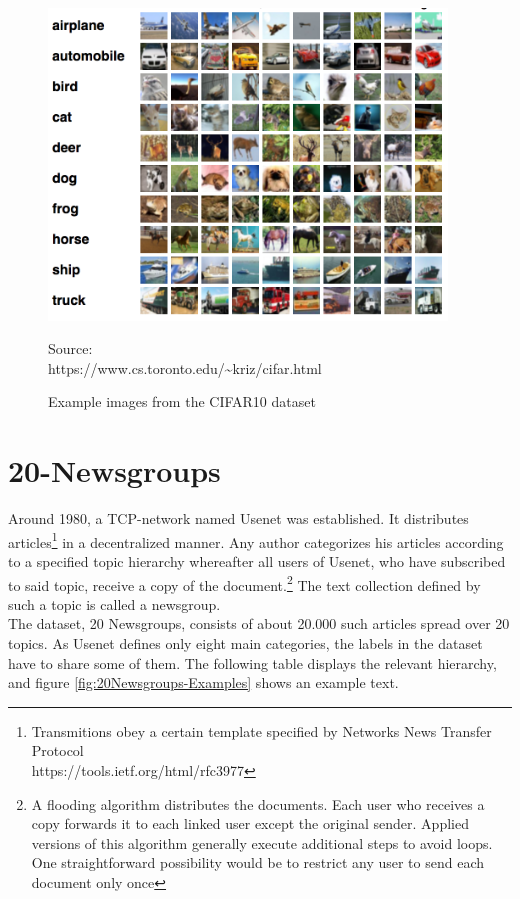 \begin{figure}
	\centering
	\includegraphics[width=400px]{gfx/6-Datasets/CIFAR10_examples.png}
	\caption{Example images from the CIFAR10 dataset}
	\vspace{7pt}
	\footnotesize{
		Source:\\
		https://www.cs.toronto.edu/\textasciitilde kriz/cifar.html
	}
	\label{fig:CIFAR10-Examples}
\end{figure}
\newpage

\section{20-Newsgroups}
Around 1980, a TCP-network named Usenet was established. It distributes articles\footnote{
	Transmitions obey a certain template specified by  Networks News Transfer Protocol\\
	https://tools.ietf.org/html/rfc3977
}
in a decentralized manner. Any author categorizes his articles according to a specified topic hierarchy whereafter all users of Usenet, who have subscribed to said topic, receive a copy of the document.\footnote{
	A flooding algorithm distributes the documents. Each user who receives a copy forwards it to each linked user except the original sender. Applied versions of this algorithm generally execute additional steps to avoid loops. One straightforward possibility would be to restrict any user to send each document only once
}
The text collection defined by such a topic is called a newsgroup. \cite{Usenet}\\
The dataset, 20 Newsgroups, consists of about 20.000 such articles spread over 20 topics. As Usenet defines only eight main categories, the labels in the dataset have to share some of them. The following table displays the relevant hierarchy, and figure \ref{fig:20Newsgroups-Examples} shows an example text. \cite{20-Newsgroups}

